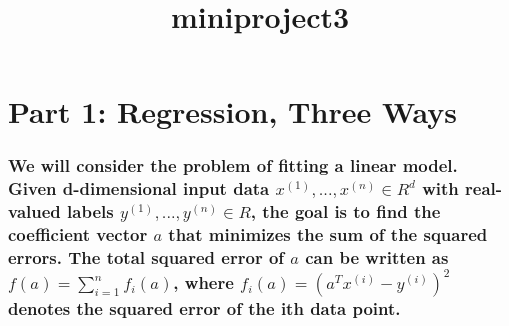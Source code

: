 \documentclass[11pt]{article}
\title{miniproject3}
\begin{document}
    
    
    \maketitle
    
    

    
    \section{Part 1: Regression, Three
Ways}\label{part-1-regression-three-ways}

    \subsubsection{\texorpdfstring{We will consider the problem of fitting a
linear model. Given d-dimensional input data
\(x^{(1)}, ... , x^{(n)} \in R^d\) with real-valued labels
\(y^{(1)}, ... , y^{(n)} \in R\), the goal is to find the coefficient
vector \(a\) that minimizes the sum of the squared errors. The total
squared error of \(a\) can be written as
\(f(a) = \sum_{i=1}^{n}f_i(a)\), where
\(f_i(a) = (a^Tx^{(i)}-y^{(i)})^2\) denotes the squared error of the ith
data
point.}{We will consider the problem of fitting a linear model. Given d-dimensional input data x\^{}\{(1)\}, ... , x\^{}\{(n)\} \textbackslash{}in R\^{}d with real-valued labels y\^{}\{(1)\}, ... , y\^{}\{(n)\} \textbackslash{}in R, the goal is to find the coefficient vector a that minimizes the sum of the squared errors. The total squared error of a can be written as f(a) = \textbackslash{}sum\_\{i=1\}\^{}\{n\}f\_i(a), where f\_i(a) = (a\^{}Tx\^{}\{(i)\}-y\^{}\{(i)\})\^{}2 denotes the squared error of the ith data point.}}\label{we-will-consider-the-problem-of-fitting-a-linear-model.-given-d-dimensional-input-data-x1-...-xn-in-rd-with-real-valued-labels-y1-...-yn-in-r-the-goal-is-to-find-the-coefficient-vector-a-that-minimizes-the-sum-of-the-squared-errors.-the-total-squared-error-of-a-can-be-written-as-fa-sum_i1nf_ia-where-f_ia-atxi-yi2-denotes-the-squared-error-of-the-ith-data-point.}
\end{document}
